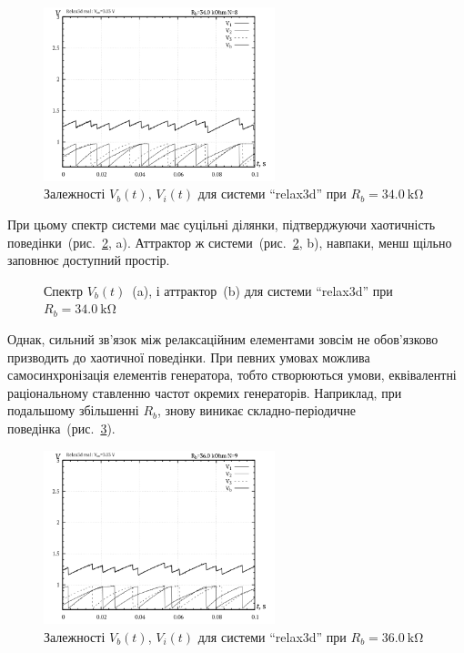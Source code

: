 \begin{figure}[htb!]
  \centerline{\includegraphics[width=0.6\textwidth]{p/relax3d_t_08.png} }
\caption{Залежності $ V_b (t) $, $ V_i (t) $ для системи ``relax3d'' при $ R_b = \SI{34.0}{\kilo\ohm} $}
\label{atu:f:relax3d_t_08}
\end{figure}

При цьому спектр системи має суцільні ділянки, підтверджуючи
хаотичність поведінки~(рис.~\ref{atu:f:relax3d_f_08}, a). Аттрактор ж
системи~(рис.~\ref{atu:f:relax3d_f_08}, b), навпаки, менш щільно заповнює
доступний простір.

\begin{figure}[htb!]
  \caption{Спектр $V_b(t)$~(a), і аттрактор~(b) для системи ``relax3d'' при $ R_b = \SI{34.0}{\kilo\ohm} $}
  \label{atu:f:relax3d_f_08}
\end{figure}

Однак, сильний зв'язок між релаксаційним елементами зовсім не
обов'язково призводить до хаотичної поведінки. При певних
умовах можлива самосинхронізація елементів генератора, тобто
створюються умови, еквівалентні раціональному ставленню частот
окремих генераторів. Наприклад, при подальшому збільшенні
$R_b$, знову виникає складно-періодичне
поведінка~(рис.~\ref{atu:f:relax3d_t_09}).

\begin{figure}[htb!]
  \centerline{\includegraphics[width=0.6\textwidth]{p/relax3d_t_09.png} }
\caption{Залежності $V_b(t)$, $V_i(t)$ для системи ``relax3d'' при $ R_b = \SI{36.0}{\kilo\ohm} $}
\label{atu:f:relax3d_t_09}
\end{figure}

